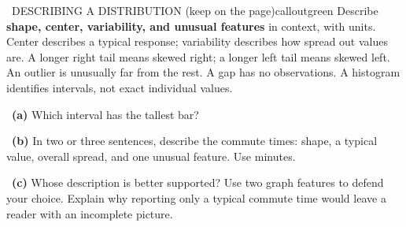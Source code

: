 \documentclass[11pt]{article}
\begin{document}
\begin{callout}{\IconBook\ DESCRIBING A DISTRIBUTION (keep on the page)}{calloutgreen}
Describe \textbf{shape, center, variability, and unusual features} in context, with units. Center describes a typical response; variability describes how spread out values are. A longer right tail means skewed right; a longer left tail means skewed left. An outlier is unusually far from the rest. A gap has no observations. A histogram identifies intervals, not exact individual values.
\end{callout}

~\textbf{(a)} Which interval has the tallest bar?\par
{}

~\textbf{(b)} In two or three sentences, describe the commute times: shape, a typical value, overall spread, and one unusual feature. Use minutes.\par
{}

~\textbf{(c)} Whose description is better supported? Use two graph features to defend your choice. Explain why reporting only a typical commute time would leave a reader with an incomplete picture.\par
{}
\end{document}
